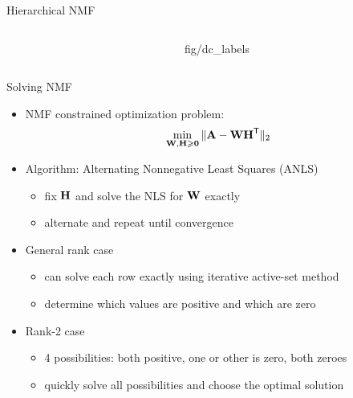 \documentclass{beamer}
\begin{document}
\begin{frame}{Hierarchical NMF}
\begin{columns}
\begin{column}{.4\textwidth}
\end{column}
\begin{column}{.6\textwidth}
	\begin{adjustbox}{width=\textwidth}
    		{fig/dc_labels}
   	\end{adjustbox}
\end{column}
\end{columns}

\end{frame}

\begin{frame}{Solving NMF}
    \begin{itemize}
        \item NMF constrained optimization problem: $$\min_{\M{W},\M{H}\geq \M{0}} \|\M{A} - \M{W}\M{H}^\Tra\|_2$$
        
        \vfill
        
        \item Algorithm: Alternating Nonnegative Least Squares (ANLS)
        \begin{itemize}
            \item fix $\M{H}$ and solve the NLS for $\M{W}$ exactly
            \item alternate and repeat until convergence
        \end{itemize}
        
        \vfill

        \item General rank case
        \begin{itemize}
            \item can solve each row exactly using iterative active-set method
            \item determine which values are positive and which are zero
        \end{itemize}
        
        \vfill
        
         \item Rank-2 case
        \begin{itemize}
            \item 4 possibilities: both positive, one or other is zero, both zeroes 
            \item quickly solve all possibilities and choose the optimal solution
        \end{itemize}
    \end{itemize}
\end{frame}
\end{document}
